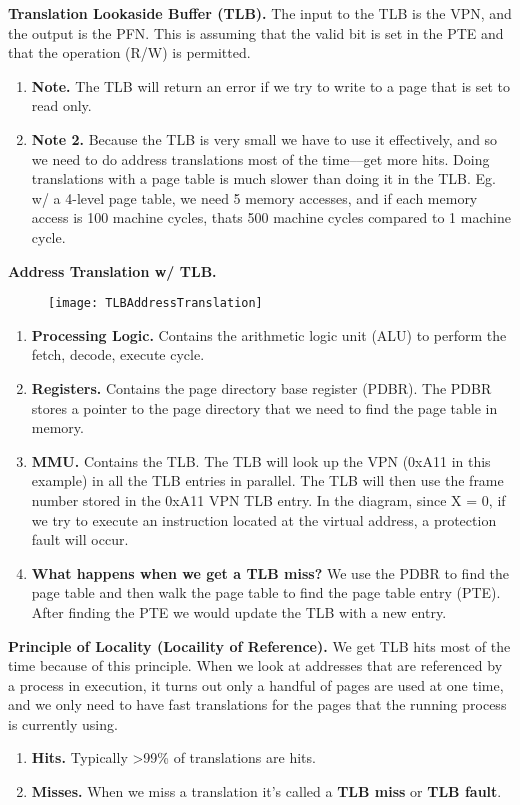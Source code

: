 \documentclass[12pt]{article}
\begin{document}
{\bf Translation Lookaside Buffer (TLB).} {The input to the TLB is the VPN, and the output is the PFN. This is assuming that the valid bit is set in the PTE and that the operation (R/W) is permitted.}
    \begin{enumerate}
        \item[]{\bf Note.} {The TLB will return an error if we try to write to a page that is set to read only.}
        \item[]{\bf Note 2.} {Because the TLB is very small we have to use it effectively, and so we need to do address translations most of the time––get more hits. Doing translations with a page table is much slower than doing it in the TLB. Eg. w/ a 4-level page table, we need 5 memory accesses, and if each memory access is 100 machine cycles, thats 500 machine cycles compared to 1 machine cycle.} 
    \end{enumerate}

{\bf Address Translation w/ TLB.}
\begin{figure}[htbp]
  \centering
  \texttt{[image: TLBAddressTranslation]} 
\end{figure}
    \begin{enumerate}
        \item[]{\bf Processing Logic.} {Contains the arithmetic logic unit (ALU) to perform the fetch, decode, execute cycle.}
        \item[]{\bf Registers.} {Contains the page directory base register (PDBR). The PDBR stores a pointer to the page directory that we need to find the page table in memory.} 
        \item[]{\bf MMU.} {Contains the TLB. The TLB will look up the VPN (0xA11 in this example) in all the TLB entries in parallel. The TLB will then use the frame number stored in the 0xA11 VPN TLB entry. In the diagram, since X = 0, if we try to execute an instruction located at the virtual address, a protection fault will occur.}
        \item[]{\bf What happens when we get a TLB miss?} {We use the PDBR to find the page table and then walk the page table to find the page table entry (PTE). After finding the PTE we would update the TLB with a new entry.}  
    \end{enumerate}

{\bf Principle of Locality (Locaility of Reference).} {We get TLB hits most of the time because of this principle. When we look at addresses that are referenced by a process in execution, it turns out only a handful of pages are used at one time, and we only need to have fast translations for the pages that the running process is currently using.}
    \begin{enumerate}
        \item[]{\bf Hits.} {Typically >99\% of translations are hits.}
        \item[]{\bf Misses.} {When we miss a translation it's called a {\bf TLB miss} or {\bf TLB fault}.} 
    \end{enumerate}
\end{document}

